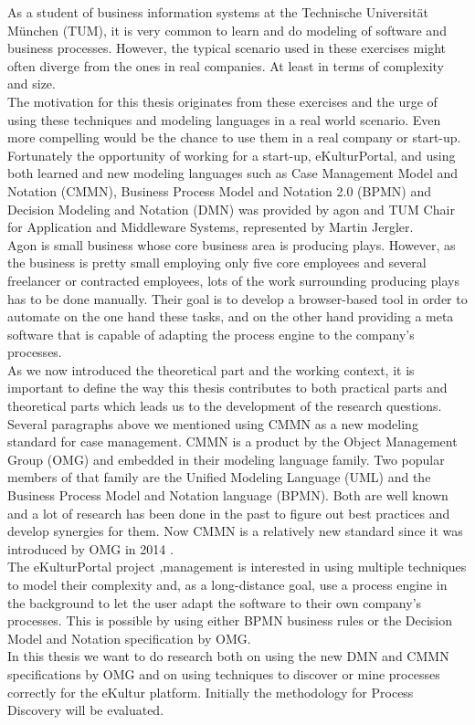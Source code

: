 As a student of business information systems at the Technische Universität München (TUM), it is very common to learn and do modeling of software and business processes. However, the typical scenario used in these exercises might often diverge from the ones in real companies. At least in terms of complexity and size. \\
The motivation for this thesis originates from these exercises and the urge of using these techniques and modeling languages in a real world scenario. Even more compelling would be the chance to use them in a real company or start-up. \\
Fortunately the opportunity of working for a start-up, eKulturPortal, and using both learned and new modeling languages such as Case Management Model and Notation (CMMN), Business Process Model and Notation 2.0 (BPMN) and Decision Modeling and Notation (DMN) was provided by agon and TUM Chair for Application and Middleware Systems, represented by Martin Jergler. \\
Agon is small business whose core business area is producing plays. However, as the business is pretty small employing only five core employees and several freelancer or contracted employees, lots of the work surrounding producing plays has to be done manually. Their goal is to develop a browser-based tool in order to automate on the one hand these tasks, and on the other hand providing a meta software that is capable of adapting the process engine to the company's processes. \\
As we now introduced the theoretical part and the working context, it is important to define the way this thesis contributes to both practical parts and theoretical parts which leads us to the development of the research questions. \\
Several paragraphs above we mentioned using CMMN as a new modeling standard for case management. CMMN is a product by the Object Management Group (OMG) and embedded in their modeling language family. Two popular members of that family are the Unified Modeling Language (UML) and the Business Process Model and Notation language (BPMN). Both are well known and a lot of research has been done in the past to figure out best practices and develop synergies for them. Now CMMN is a relatively new standard since it was introduced by OMG in 2014 \cite{cmmnSpec}. \\
The eKulturPortal project ,management is interested in using multiple techniques to model their complexity and, as a long-distance goal, use a process engine in the background to let the user adapt the software to their own company's processes. This is possible by using either BPMN business rules or the Decision Model and Notation specification by OMG. \\
In this thesis we want to do research both on using the new DMN and CMMN specifications by OMG and on using techniques to discover or mine processes correctly for the eKultur platform. Initially the methodology for Process Discovery will be evaluated. 